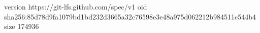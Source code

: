 version https://git-lfs.github.com/spec/v1
oid sha256:85d78d9fa1079bd1bd232d3665a32c76598e3e48a975d062212b984511c544b4
size 174936
